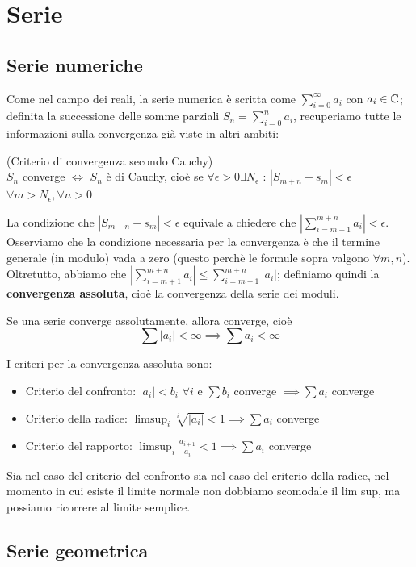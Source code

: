 \chapter{Serie}

\section{Serie numeriche}

Come nel campo dei reali, la serie numerica è scritta come $\sum_{i=0} ^{\infty} a_i$ con $a_i \in \mathbb{C}$; definita la successione delle somme parziali $S_n=\sum_{i=0} ^n a_i$, recuperiamo tutte le informazioni sulla convergenza già viste in altri ambiti:
\begin{teorema} (Criterio di convergenza secondo Cauchy)\\$S_n$ converge $\iff$ $S_n$ è di Cauchy, cioè se $\forall \epsilon >0 \exists N_{\epsilon}$ : $|S_{m+n} - s_m| < \epsilon$ $\forall m>N_{\epsilon}, \forall n>0$
\end{teorema}
La condizione che $|S_{m+n} - s_m| < \epsilon$ equivale a chiedere che $\left|\sum_{i=m+1} ^{m+n} a_i \right| < \epsilon$. \\Osserviamo che la condizione necessaria per la convergenza è che il termine generale (in modulo) vada a zero (questo perchè le formule sopra valgono $\forall m,n$). Oltretutto, abbiamo che $\left|\sum_{i=m+1} ^{m+n} a_i \right| \leq \sum_{i=m+1} ^{m+n} |a_i|$; definiamo quindi la \textbf{convergenza assoluta}, cioè la convergenza della serie dei moduli.
\begin{teorema}
Se una serie converge assolutamente, allora converge, cioè 
$$\sum |a_i|<\infty \implies \sum a_i<\infty$$
\end{teorema}
I criteri per la convergenza assoluta sono:
\begin{itemize}
\item Criterio del confronto:	$|a_i|<b_i$ $\forall i$ e $\sum b_i$ converge $\implies \sum a_i$ converge
\item Criterio della radice:		$\limsup_i \sqrt[i] {|a_i|} <1 \implies \sum a_i$ converge
\item Criterio del rapporto:		$\limsup_i \frac{a_{i+1}}{a_i}<1 \implies \sum a_i$ converge
\end{itemize}
	Sia nel caso del criterio del confronto sia nel caso del criterio della radice, nel momento in cui esiste il limite normale non dobbiamo scomodale il lim sup, ma possiamo ricorrere al limite semplice.

\section{Serie geometrica}

